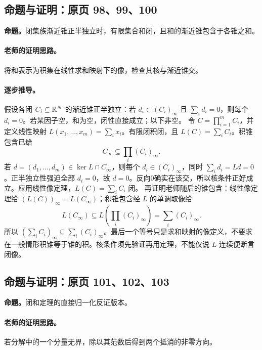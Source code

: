 \subsection{命题与证明：原页 98、99、100}

\textbf{命题。}闭集族渐近锥正半独立时，有限集合和闭，且和的渐近锥包含于各锥之和。

\paragraph{老师的证明思路。}将和表示为积集在线性求和映射下的像，检查其核与渐近锥交。

\paragraph{逐步推导。}
假设各闭 $C_i\subseteq\mathbb{R}^N$ 的渐近锥正半独立：若 $d_i\in(C_i)_\infty$ 且 $\sum_i d_i=0$，则每个 $d_i=0$。若某因子空，和为空，闭性直接成立；以下非空。
令 $C=\prod_{i=1}^mC_i$，并定义线性映射 $L(x_1,\ldots,x_m)=\sum_i x_i$。有限闭积闭，且 $L(C)=\sum_iC_i$。积锥包含已给
\[C_\infty\subseteq\prod_i(C_i)_\infty.\]
若 $d=(d_1,\ldots,d_m)\in\ker L\cap C_\infty$，则每个 $d_i\in(C_i)_\infty$，同时 $\sum_id_i=Ld=0$。正半独立性强迫全部 $d_i=0$，故 $d=0$。反向0确实在该交，所以核条件正好成立。应用线性像定理，$L(C)=\sum_iC_i$ 闭。
再证明老师随后的锥包含：线性像定理给 $(L(C))_\infty=L(C_\infty)$；积锥包含经 $L$ 的单调取像给
\[L(C_\infty)\subseteq L\left(\prod_i(C_i)_\infty\right)=\sum_i(C_i)_\infty.\]
所以 $(\sum_iC_i)_\infty\subseteq\sum_i(C_i)_\infty$。最后一个等号只是求和映射的像定义，不要求在一般情形积锥等于锥的积。核条件须先验证再用定理，不能仅说 $L$ 连续便断言闭像。


\subsection{命题与证明：原页 101、102、103}

\textbf{命题。}闭和定理的直接归一化反证版本。

\paragraph{老师的证明思路。}若分解中的一个分量无界，除以其范数后得到两个抵消的非零方向。

